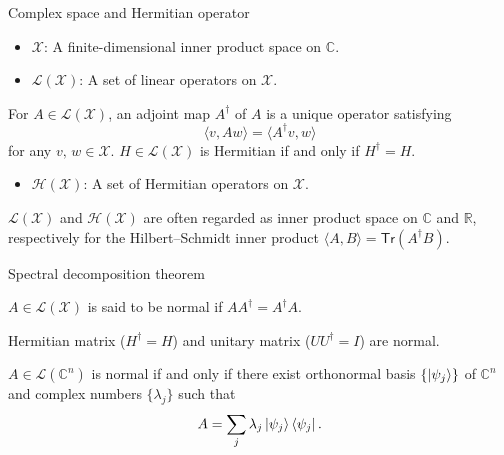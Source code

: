\documentclass{beamer}
\newcommand{\Tr}{\mathsf{Tr}}
\newcommand\emm[1]{\textcolor{redorange}{{#1}}}
\begin{document}
\begin{frame}{Complex space and Hermitian operator}
\begin{itemize}
\item $\mathcal{X}$: A finite-dimensional inner product space on $\mathbb{C}$.
\item $\mathcal{L}(\mathcal{X})$: A set of linear operators on $\mathcal{X}$.
\end{itemize}

\vspace{1em}
For $A\in\mathcal{L}(\mathcal{X})$, an adjoint map $A^\dagger$ of $A$ is a unique operator satisfying
\begin{equation*}
\langle v, Aw\rangle = \langle A^\dagger v, w\rangle
\end{equation*}
for any $v,\,w\in\mathcal{X}$.
$H\in\mathcal{L}(\mathcal{X})$ is Hermitian if and only if $H^\dagger = H$.

\vspace{1em}
\begin{itemize}
\item $\mathcal{H}(\mathcal{X})$: A set of Hermitian operators on $\mathcal{X}$.
\end{itemize}

\vspace{2em}
$\mathcal{L}(\mathcal{X})$ and $\mathcal{H}(\mathcal{X})$ are often regarded as inner product space on $\mathbb{C}$ and $\mathbb{R}$, respectively
for the Hilbert--Schmidt inner product $\langle A, B\rangle = \Tr(A^\dagger B)$.
\end{frame}

\begin{frame}{Spectral decomposition theorem}
\begin{definition}
$A\in\mathcal{L}(\mathcal{X})$ is said to be \emm{normal} if $AA^\dagger = A^\dagger A$.
\end{definition}

\vspace{1em}
Hermitian matrix ($H^\dagger = H$) and unitary matrix ($UU^\dagger = I$) are normal.

\vspace{2em}
\begin{theorem}
$A\in \mathcal{L}(\mathbb{C}^n)$ is \emm{normal} if and only if there exist orthonormal basis $\{\ket{\psi_j}\}$ of $\mathbb{C}^n$ and complex numbers $\{\lambda_j\}$ such that
\begin{equation*}
A=\sum_j \lambda_j\ket{\psi_j}\bra{\psi_j}.
\end{equation*}
\end{theorem}
\end{frame}
\end{document}
